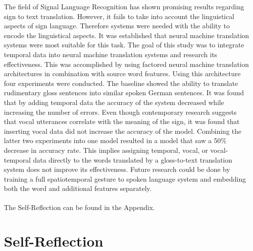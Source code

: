 The field of Signal Language Recognition has shown promising results regarding sign to text translation. However, it fails to take into account the linguistical aspects of sign language. Therefore systems were needed with the ability to encode the linguistical aspects. It was established that neural machine translation systems were most suitable for this task. The goal of this study was to integrate temporal data into neural machine translation systems and research its effectiveness. This was accomplished by using factored neural machine translation architectures in combination with source word features. Using this architecture four experiments were conducted. The baseline showed the ability to translate rudimentary gloss sentences into similar spoken German sentences. It was found that by adding temporal data the accuracy of the system decreased while increasing the number of errors. Even though contemporary research suggests that vocal utterances correlate with the meaning of the sign, it was found that inserting vocal data did not increase the accuracy of the model. Combining the latter two experiments into one model resulted in a model that saw a 50\% decrease in accuracy rate. This implies assigning temporal, vocal, or vocal-temporal data directly to the words translated by a gloss-to-text translation system does not improve its effectiveness. Future research could be done by training a full spatiotemporal gesture to spoken language system and embedding both the word and additional features separately.
\\
\\
The Self-Reflection can be found in the Appendix.



\section{Self-Reflection}

